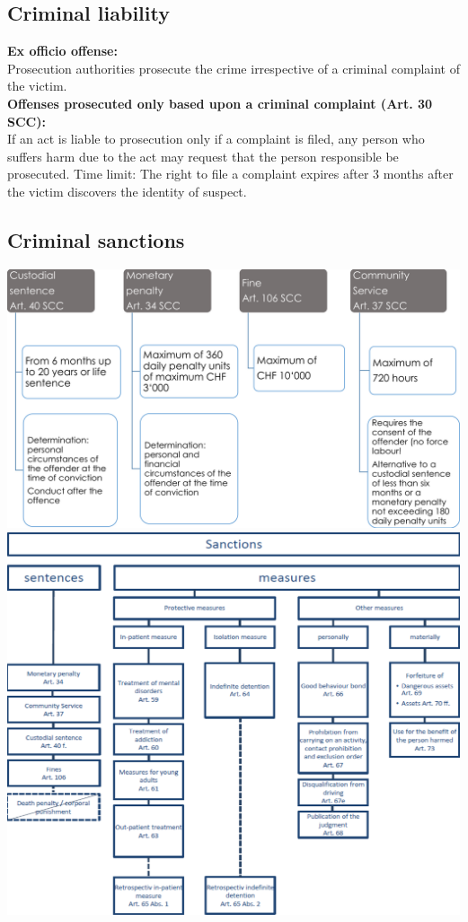 \subsection{Criminal liability}
\textbf{Ex officio offense:}\\
Prosecution authorities prosecute the crime irrespective of a criminal complaint of the victim.\\
\textbf{Offenses prosecuted only based upon a criminal complaint (Art. 30 SCC):}\\
If an act is liable to prosecution only if a complaint is filed, any person who suffers harm due to the act may request that the person responsible be prosecuted. Time limit: The right to file a complaint expires after 3 months after the victim discovers the identity of suspect.

\subsection{Criminal sanctions}
\includegraphics[width=1\linewidth]{images/criminalsanctions}
\includegraphics[width=1\linewidth]{images/criminalsanctions2}

